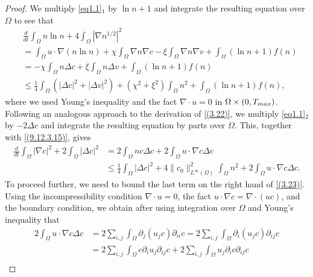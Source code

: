 \documentclass[10pt,a4paper]{amsart}
\numberwithin{equation}{section}
\begin{document}
\begin{proof} 
We multiply \eqref{eq1.1}$_1$  by $ \ln n + 1 $ and integrate the resulting equation 
over $ \Omega $ to see that
\begin{equation}\label{(3.22)}
\begin{aligned}
&\frac{d}{dt} \int_{\Omega} n \ln n  + 4 \int_{\Omega} |\nabla n^{1/2}|^2
\\&= \int_{\Omega} u \cdot \nabla (n\ln n) 
 + \chi \int_{\Omega} \nabla n \nabla c-\xi \int_{\Omega} \nabla n \nabla v 
 + \int_{\Omega} (\ln n + 1)
f(n) \\
&= -\chi \int_{\Omega} n \Delta c +\xi \int_{\Omega} n \Delta v
  + \int_{\Omega} (\ln n + 1) f(n) \\
&\leq \frac{1}{4} \int_{\Omega} \left(|\Delta c|^2+|\Delta v|^2\right)
  + (\chi^2+\xi^2 ) \int_{\Omega} n^2 + \int_{\Omega} \left(\ln n + 1\right) f(n),
\end{aligned}
\end{equation}
where we used Young's inequality and the fact $\nabla \cdot u = 0$ in 
$\Omega \times (0, T_{\rm max})$. Following an analogous approach to the derivation 
of \eqref{(3.22)}, we multiply \eqref{eq1.1}$_2$ by $-2\Delta c$ and integrate the 
resulting equation by parts over $\Omega$. This, together with \eqref{(9.12.3.15)}, 
gives 
\begin{equation}\label{(3.23)}
\begin{aligned}
\frac{d}{dt} \int_\Omega |\nabla c|^2 + 2 \int_\Omega |\Delta c|^2
&= 2 \int_\Omega nc\Delta c + 2 \int_\Omega u \cdot \nabla c \Delta c \\
&\leq \frac{1}{4} \int_\Omega |\Delta c|^2 
 + 4\|c_0\|_{L^\infty(\Omega)}^2 \int_\Omega n^2 
 + 2 \int_\Omega u \cdot \nabla c \Delta c.
\end{aligned}
\end{equation}
To proceed further, we need to bound the last term on the right hand of \eqref{(3.23)}. 
Using the incompressibility condition $\nabla \cdot u=0$, the fact 
$u \cdot \nabla c =\nabla \cdot (uc)$, and the boundary condition, we obtain after
 using integration over $\Omega$ and Young's inequality that
\begin{equation}\label{(3.24)}
\begin{aligned}
2 \int_\Omega u \cdot \nabla c \Delta c
&= 2 \sum_{i,j} \int_\Omega \partial_j (u_j c)\partial_{ii} c
 = 2 \sum_{i,j} \int_\Omega \partial_i (u_j c)\partial_{ij} c \\
&= 2 \sum_{i,j} \int_\Omega c\partial_i u_j  \partial_{ij} c 
 + 2 \sum_{i,j} \int_\Omega u_j \partial_i c \partial_{ij} c  \\

\end{aligned}
\end{equation}
\end{proof}
\end{document}
